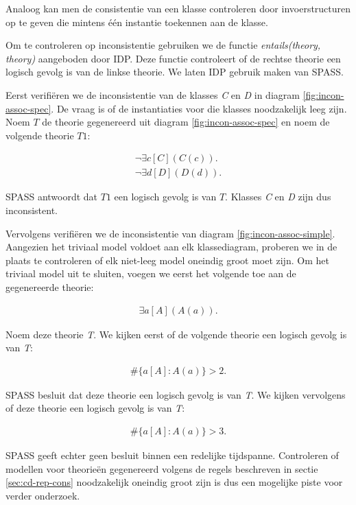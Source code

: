Analoog kan men de consistentie van een klasse controleren door invoerstructuren op te geven die mintens \'e\'en instantie toekennen aan de klasse.

Om te controleren op inconsistentie gebruiken we de functie \textit{entails(theory, theory)} aangeboden door IDP\cite{DeCatBroes2014PLaa}. Deze functie controleert of de rechtse theorie een logisch gevolg is van de linkse theorie. We laten IDP gebruik maken van SPASS\cite{SPASS}.

Eerst verifi\"eren we de inconsistentie van de klasses \textit{C} en \textit{D} in diagram \ref{fig:incon-assoc-spec}. De vraag is of de instantiaties voor die klasses noodzakelijk leeg zijn. Noem $T$ de theorie gegenereerd uit diagram \ref{fig:incon-assoc-spec} en noem de volgende theorie $T1$:

\begin{align*}
	\lnot{}\exists{c}[C](C(c)). \\
	\lnot{}\exists{d}[D](D(d)).
\end{align*}

SPASS antwoordt dat $T1$ een logisch gevolg is van $T$. Klasses \textit{C} en \textit{D} zijn dus inconsistent.

Vervolgens verifi\"eren we de inconsistentie van diagram \ref{fig:incon-assoc-simple}. Aangezien het triviaal model voldoet aan elk klassediagram, proberen we in de plaats te controleren of elk niet-leeg model oneindig groot moet zijn. Om het triviaal model uit te sluiten, voegen we eerst het volgende toe aan de gegenereerde theorie:

\begin{align*}
	\exists{a}[A](A(a)).
\end{align*}

Noem deze theorie \textit{T}. We kijken eerst of de volgende theorie een logisch gevolg is van \textit{T}:

\begin{align*}
	\#\{a [A] : A(a)\} > 2.
\end{align*}

SPASS besluit dat deze theorie een logisch gevolg is van \textit{T}. We kijken vervolgens of deze theorie een logisch gevolg is van \textit{T}:

\begin{align*}
\#\{a [A] : A(a)\} > 3.
\end{align*}

SPASS geeft echter geen besluit binnen een redelijke tijdspanne. Controleren of modellen voor theorie\"en gegenereerd volgens de regels beschreven in sectie \ref{sec:cd-rep-cons} noodzakelijk oneindig groot zijn is dus een mogelijke piste voor verder onderzoek.